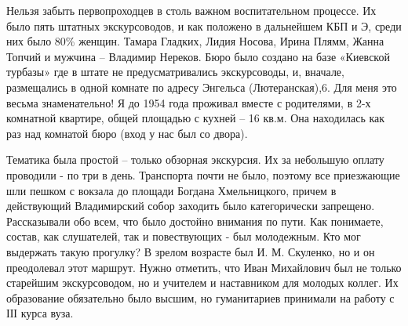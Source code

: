 Нельзя забыть первопроходцев в столь важном воспитательном процессе. Их было
пять штатных экскурсоводов, и как положено в дальнейшем КБП и Э, среди них было
80\% женщин. Тамара Гладких, Лидия Носова, Ирина Плямм, Жанна Топчий и мужчина –
Владимир Нереков. Бюро было создано на базе «Киевской турбазы» где в штате не
предусматривались экскурсоводы, и, вначале, размещались в одной комнате по
адресу Энгельса (Лютеранская),6. Для меня это весьма знаменательно! Я до 1954
года проживал вместе с родителями, в 2-х комнатной квартире, общей площадью с
кухней – 16 кв.м. Она находилась как раз над комнатой бюро (вход у нас был со
двора).

\raggedcolumns
\begin{multicols}{2} %
\setlength{\parindent}{0pt}




\end{multicols} %

Тематика была простой – только обзорная экскурсия. Их за небольшую оплату
проводили - по три в день. Транспорта почти не было, поэтому все приезжающие
шли пешком с вокзала до площади Богдана Хмельницкого, причем в действующий
Владимирский собор заходить было категорически запрещено. Рассказывали обо
всем, что было достойно внимания по пути. Как понимаете, состав, как
слушателей, так и повествующих - был молодежным. Кто мог выдержать такую
прогулку? В зрелом возрасте был И. М. Скуленко, но и он преодолевал этот маршрут.
Нужно отметить, что Иван Михайлович был не только старейшим экскурсоводом, но и
учителем и наставником для молодых коллег. Их образование обязательно было
высшим, но гуманитариев принимали на работу с ІІІ курса вуза.

